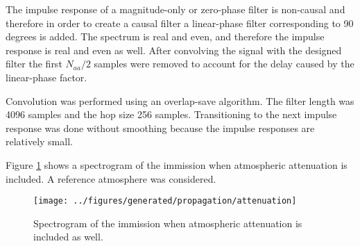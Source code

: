 The impulse response of a magnitude-only or zero-phase filter is non-causal and therefore in
order to create a causal filter a linear-phase filter corresponding to 90
degrees is added. The spectrum is real and even, and therefore the impulse
response is real and even as well. After convolving the signal with the designed
filter the first $N_{aa}/2$ samples were removed to account for the delay caused
by the linear-phase factor.

Convolution was performed using an overlap-save algorithm. The filter length was
4096 samples and the hop size 256 samples. Transitioning to the next impulse
response was done without smoothing because the impulse responses are relatively small.

Figure \ref{fig:implementation:propagation:attenuation} shows a spectrogram of
the immission when atmospheric attenuation is included. A reference atmosphere
was considered.

\begin{figure}[H]
  \centering
  \texttt{[image: ../figures/generated/propagation/attenuation]}
  \caption{Spectrogram of the immission when atmospheric attenuation is included as well.}
  \label{fig:implementation:propagation:attenuation}
\end{figure}

